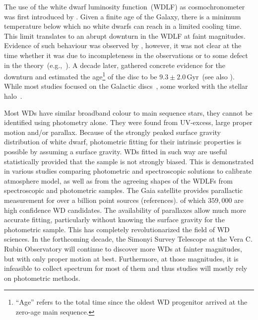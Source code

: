 \documentclass[fleqn,usenatbib]{rasti}
\begin{document}
The use of the white dwarf luminosity function~(WDLF) as cosmochronometer was
first introduced by \citet{1959ApJ...129..243S}. Given a finite age of the
Galaxy, there is a minimum temperature below which no white dwarfs can reach in
a limited cooling time. This limit translates to an abrupt downturn in the WDLF
at faint magnitudes. Evidence of such behaviour was observed by
\citet{1979ApJ...233..226L}, however, it was not clear at the time whether it
was due to incompleteness in the observations or to some defect in the
theory~(e.g.,~\citealp{1984ApJ...282..615I}). A decade later,
\citet{1987ApJ...315L..77W} gathered concrete evidence for the downturn and
estimated the age\footnote{``Age'' refers to the total time since the oldest
WD progenitor arrived at the zero-age main sequence.} of the disc to be
$9.3 \pm 2.0$\,Gyr~(see also \citealt{1988ApJ...332..891L}). While most studies
focused on the Galactic discs~\citep{1989LNP...328...15L, 1992ApJ...386..539W,
1995LNP...443...24O, 1998ApJ...497..294L, 1999MNRAS.306..736K,
2012ApJS..199...29G}, some worked with the stellar
halo~\citep{2006AJ....131..571H, 2011MNRAS.417...93R, 2017AJ....153...10M,
2019MNRAS.482..715L}. 
 
Most WDs have similar broadband colour to main sequence stars, they cannot be
identified using photometry alone. They were found from UV-excess, large
proper motion and/or parallax. Because of the strongly peaked surface gravity
distribution of white dwarf, photometric fitting for their intrinsic properties
is possible by assuming a surface gravity. WDs fitted in such way are useful
statistically provided that the sample is not strongly biased. This is
demonstrated in various studies comparing photometric and spectroscopic
solutions to calibrate atmosphere model, as well as from the agreeing shapes
of the WDLFs from spectroscopic and photometric samples. The Gaia satellite
provides parallactic measurement for over a billion point sources (references).
of which $359,000$ are high confidence WD candidates. The availability of
parallaxes allow much more accurate fitting, particularly without knowing
the surface gravity for the photometric sample. This has completely 
revolutionarized the field of WD sciences. In the forthcoming decade, the
Simonyi Survey Telescope at the Vera C. Rubin Observatory will continue to
discover more WDs at fainter magnitudes, but with only proper motion at best.
Furthermore, at those magnitudes, it is infeasible to collect spectrum for
most of them and thus studies will mostly rely on photometric methods.
\end{document}
